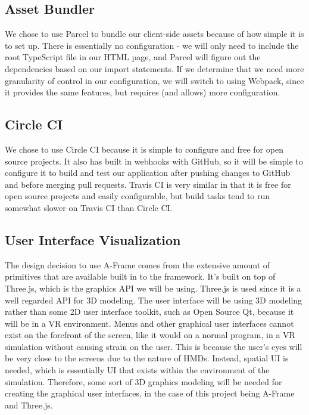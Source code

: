 \documentclass[onecolumn, draftclsnofoot,10pt, compsoc]{IEEEtran}
\begin{document}
\subsection{Asset Bundler}
We chose to use Parcel to bundle our client-side assets because of how simple it is to set up. There is essentially no configuration - we will only need to include the root TypeScript file in our HTML page, and Parcel will figure out the dependencies based on our import statements. If we determine that we need more granularity of control in our configuration, we will switch to using Webpack, since it provides the same features, but requires (and allows) more configuration. 

\subsection{Circle CI}
We chose to use Circle CI because it is simple to configure and free for open source projects. It also has built in webhooks with GitHub, so it will be simple to configure it to build and test our application after pushing changes to GitHub and before merging pull requests. Travis CI is very similar in that it is free for open source projects and easily configurable, but build tasks tend to run somewhat slower on Travis CI than Circle CI.

\subsection{User Interface Visualization}
The design decision to use A-Frame comes from the extensive amount of primitives that are available built in to the framework. It's built on top of Three.js, which is the graphics API we will be using. Three.js is used since it is a well regarded API for 3D modeling. The user interface will be using 3D modeling rather than some 2D user interface toolkit, such as Open Source Qt, because it will be in a VR environment. Menus and other graphical user interfaces cannot exist on the forefront of the screen, like it would on a normal program, in a VR simulation without causing strain on the user. This is because the user's eyes will be very close to the screens due to the nature of HMDs. Instead, spatial UI is needed, which is essentially UI that exists within the environment of the simulation. Therefore, some sort of 3D graphics modeling will be needed for creating the graphical user interfaces, in the case of this project being A-Frame and Three.js.
\end{document}
